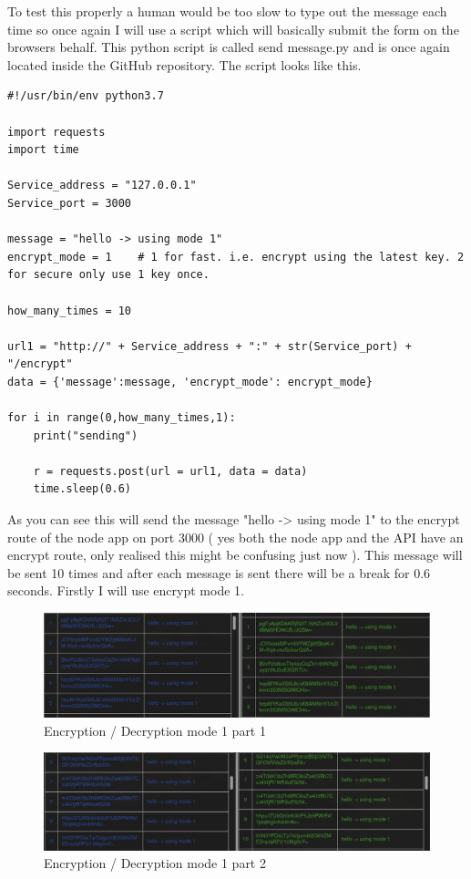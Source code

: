 To test this properly a human would be too slow to type out the message each time so once again I will use a script which will basically submit the form on the browsers behalf. This python script is called send message.py and is once again located inside the GitHub repository.
The script looks like this.
\begin{lstlisting}
#!/usr/bin/env python3.7

import requests
import time

Service_address = "127.0.0.1"
Service_port = 3000

message = "hello -> using mode 1"
encrypt_mode = 1	# 1 for fast. i.e. encrypt using the latest key. 2 for secure only use 1 key once.

how_many_times = 10

url1 = "http://" + Service_address + ":" + str(Service_port) + "/encrypt"
data = {'message':message, 'encrypt_mode': encrypt_mode}

for i in range(0,how_many_times,1):
	print("sending")
	 
	r = requests.post(url = url1, data = data) 
	time.sleep(0.6)
\end{lstlisting}
As you can see this will send the message "hello -> using mode 1" to the encrypt route of the node app on port 3000 ( yes both the node app and the API have an encrypt route, only realised this might be confusing just now ).
This message will be sent 10 times and after each message is sent there will be a break for 0.6 seconds.
Firstly I will use encrypt mode 1.


\begin{figure}[!h]
  \centering
      \includegraphics[width=1\textwidth]{Figures/b17.png}
  \caption[Encryption / Decryption mode 1 part 1]{Encryption / Decryption mode 1 part 1}
  \label{fig:b17}
\end{figure}
\FloatBarrier

\begin{figure}[!h]
  \centering
      \includegraphics[width=1\textwidth]{Figures/b18.png}
  \caption[Encryption / Decryption mode 1 part 2]{Encryption / Decryption mode 1 part 2}
  \label{fig:b18}
\end{figure}
\FloatBarrier

